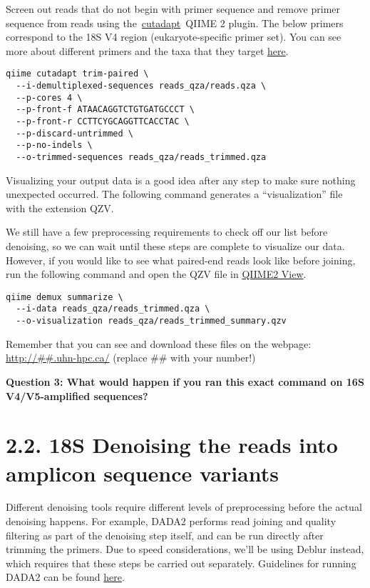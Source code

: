 \documentclass[
]{book}
\begin{document}
Screen out reads that do not begin with primer sequence and remove primer sequence from reads using the~\href{http://cutadapt.readthedocs.io/en/stable/guide.html}{cutadapt}~QIIME 2 plugin. The below primers correspond to the 18S V4 region (eukaryote-specific primer set). You can see more about different primers and the taxa that they target \href{https://imr.bio/protocols.html}{here}.

\begin{verbatim}
qiime cutadapt trim-paired \
  --i-demultiplexed-sequences reads_qza/reads.qza \
  --p-cores 4 \
  --p-front-f ATAACAGGTCTGTGATGCCCT \
  --p-front-r CCTTCYGCAGGTTCACCTAC \
  --p-discard-untrimmed \
  --p-no-indels \
  --o-trimmed-sequences reads_qza/reads_trimmed.qza
\end{verbatim}

Visualizing your output data is a good idea after any step to make sure nothing unexpected occurred. The following command generates a ``visualization'' file with the extension QZV.

We still have a few preprocessing requirements to check off our list before denoising, so we can wait until these steps are complete to visualize our data. However, if you would like to see what paired-end reads look like before joining, run the following command and open the QZV file in \href{https://view.qiime2.org/}{QIIME2 View}.

\begin{verbatim}
qiime demux summarize \
  --i-data reads_qza/reads_trimmed.qza \
  --o-visualization reads_qza/reads_trimmed_summary.qzv
\end{verbatim}

Remember that you can see and download these files on the webpage: \url{http://\#\#.uhn-hpc.ca/} (replace \#\# with your number!)

\textbf{Question 3: What would happen if you ran this exact command on 16S V4/V5-amplified sequences?}

\section{2.2. 18S Denoising the reads into amplicon sequence variants}\label{s-denoising-the-reads-into-amplicon-sequence-variants-1}

Different denoising tools require different levels of preprocessing before the actual denoising happens. For example, DADA2 performs read joining and quality filtering as part of the denoising step itself, and can be run directly after trimming the primers. Due to speed considerations, we'll be using Deblur instead, which requires that these steps be carried out separately. Guidelines for running DADA2 can be found \href{https://github.com/LangilleLab/microbiome_helper/wiki/QIIME2-DADA2-Quick-Reference}{here}.
\end{document}
